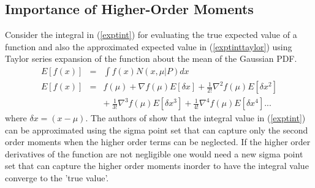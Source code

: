 \documentclass[letterpaper, 10 pt, conference]{ieeeconf}  %
\begin{document}
\subsection{Importance of Higher-Order Moments}
Consider the integral in (\ref{exptint}) for evaluating the true expected value of a function and also the approximated expected value in (\ref{exptinttaylor}) using Taylor series expansion of the function about the mean of the Gaussian PDF.
\setlength{\arraycolsep}{0.0em}
\begin{eqnarray}
E[f(x)]&{}={}& \int{f(x)N(x,\mu|P)}dx \label{exptint}\\
E[f(x)]&{}={}& f(\mu)+\nabla{f(\mu)}E[\delta{x}]+\frac{1}{2!}\nabla^2f(\mu)E[\delta{x}^2]\nonumber \\ 
&&{+}\: \frac{1}{3!}\nabla^3f(\mu)E[\delta{x}^3]+\frac{1}{4!}\nabla^4f(\mu)E[\delta{x}^4]... \label{exptinttaylor}
\end{eqnarray}
\setlength{\arraycolsep}{5pt}
where $\delta{x}=(x-\mu)$. The authors of \cite{c1} show that the integral value in (\ref{exptint}) can be approximated using the sigma point set that can capture only the second order moments when the higher order terms can be neglected. If the higher order derivatives of the function are not negligible one would need a new sigma point set that can capture the higher order moments inorder to have the integral value converge to the 'true value'.
\end{document}
